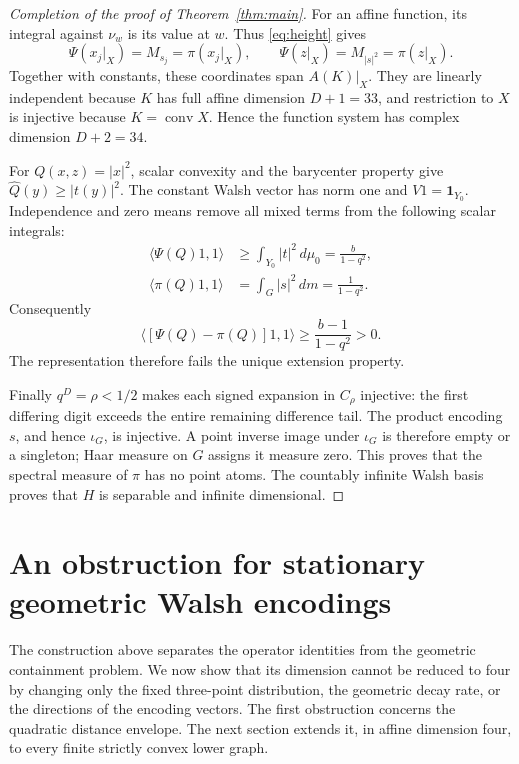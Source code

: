 \documentclass[11pt,letterpaper]{amsart}
\theoremstyle{definition}
\theoremstyle{remark}
\numberwithin{equation}{section}
\begin{document}
\begin{proof}[Completion of the proof of Theorem~\ref{thm:main}]
For an affine function, its integral against \(\nu_w\) is its
value at \(w\). Thus \eqref{eq:height} gives
\[
 \Psi(x_j|_X)=M_{s_j}=\pi(x_j|_X),\qquad
 \Psi(z|_X)=M_{|s|^2}=\pi(z|_X).
\]
Together with constants, these coordinates span \(A(K)|_X\).
They are linearly independent because \(K\) has full affine
dimension \(D+1=33\), and restriction to \(X\) is injective
because \(K=\operatorname{conv}X\). Hence the function system
has complex dimension \(D+2=34\).

For \(Q(x,z)=|x|^2\), scalar convexity and the barycenter
property give \(\widehat Q(y)\ge|t(y)|^2\).
The constant Walsh vector has norm one and
\(V1=\mathbf1_{Y_0}\). Independence and zero means remove all
mixed terms from the following scalar integrals:
\[
 \begin{split}
 \langle\Psi(Q)1,1\rangle
       &\ge\int_{Y_0}|t|^2\,d\mu_0=\frac b{1-q^2},\\
 \langle\pi(Q)1,1\rangle
       &=\int_G|s|^2\,dm=\frac1{1-q^2}.
 \end{split}
\]
Consequently
\[
              \langle[\Psi(Q)-\pi(Q)]1,1\rangle
                         \ge\frac{b-1}{1-q^2}>0.
\]
The representation therefore fails the unique extension property.

Finally \(q^D=\rho<1/2\) makes each signed expansion in
\(C_\rho\) injective: the first differing digit exceeds the
entire remaining difference tail. The product encoding \(s\),
and hence \(\iota_G\), is injective. A point inverse image under
\(\iota_G\) is therefore empty or a singleton; Haar measure on
\(G\) assigns it measure zero. This proves that the spectral
measure of \(\pi\) has no point atoms. The countably infinite
Walsh basis proves that \(H\) is separable and infinite dimensional.
\end{proof}

\section{An obstruction for stationary geometric Walsh encodings}
\label{enc:sec}

The construction above separates the operator identities from the
geometric containment problem. We now show that its dimension
cannot be reduced to four by changing only the fixed three-point
distribution, the geometric decay rate, or the directions of the
encoding vectors. The first obstruction concerns the quadratic
distance envelope. The next section extends it, in affine dimension
four, to every finite strictly convex lower graph.
\end{document}
